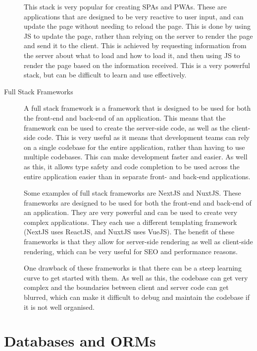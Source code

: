 \documentclass[11pt, a4paper,twoside]{report}
\theoremstyle{plain} %
\theoremstyle{definition} %
\numberwithin{equation}{chapter}
\begin{document}
\begin{description}
{        This stack is very popular for creating SPAs and PWAs. These are
        applications that are designed to be very reactive to user input, and
        can update the page without needing to reload the page. This is done by
        using JS to update the page, rather than relying on the server to
        render the page and send it to the client. This is achieved by
        requesting information from the server about what to load and how to
        load it, and then using JS to render the page based on the information
        received. This is a very powerful stack, but can be difficult to learn
        and use effectively.
        }
    \item[Full Stack Frameworks] {
        A full stack framework is a framework that is designed to be used for
        both the front-end and back-end of an application. This means that the
        framework can be used to create the server-side code, as well as the
        client-side code. This is very useful as it means that development
        teams can rely on a single codebase for the entire application, rather
        than having to use multiple codebases. This can make development faster
        and easier. As well as this, it allows type safety and code completion
        to be used across the entire application easier than in separate front-
        and back-end applications.

        Some examples of full stack frameworks are NextJS and NuxtJS\@. These
        frameworks are designed to be used for both the front-end and back-end
        of an application. They are very powerful and can be used to create
        very complex applications. They each use a different templating
        framework (NextJS uses ReactJS, and NuxtJS uses VueJS). The benefit of
        these frameworks is that they allow for server-side rendering as well
        as client-side rendering, which can be very useful for SEO and
        performance reasons.

        One drawback of these frameworks is that there can be a steep learning
        curve to get started with them. As well as this, the codebase can get
        very complex and the boundaries between client and server code can get
        blurred, which can make it difficult to debug and maintain the codebase
        if it is not well organised.
        }
\end{description}

\section{Databases and ORMs}\label{sec:databasesorms}
\end{document}
